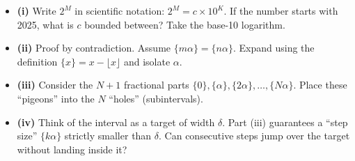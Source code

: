 \begin{hint}
\begin{itemize}
    \item \textbf{(i)} Write $2^M$ in scientific notation: $2^M = c \times 10^K$. If the number starts with 2025, what is $c$ bounded between? Take the base-10 logarithm.
    \item \textbf{(ii)} Proof by contradiction. Assume $\{m\alpha\} = \{n\alpha\}$. Expand using the definition $\{x\} = x - \lfloor x \rfloor$ and isolate $\alpha$.
    \item \textbf{(iii)} Consider the $N+1$ fractional parts $\{0\}, \{\alpha\}, \{2\alpha\}, \dots, \{N\alpha\}$. Place these ``pigeons'' into the $N$ ``holes'' (subintervals).
    \item \textbf{(iv)} Think of the interval as a target of width $\delta$. Part (iii) guarantees a ``step size'' $\{k\alpha\}$ strictly smaller than $\delta$. Can consecutive steps jump over the target without landing inside it?
\end{itemize}
\end{hint}

